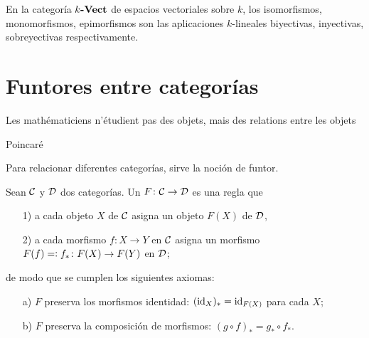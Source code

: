 \documentclass{article}
\numberwithin{equation}{section}
\theoremstyle{definition}
\begin{document}
\begin{ejemplo}
  En la categoría $k\text{\bf -Vect}$ de espacios vectoriales sobre $k$, los
  isomorfismos, monomorfismos, epimorfismos son las aplicaciones $k$-lineales
  biyectivas, inyectivas, sobreyectivas respectivamente.
\end{ejemplo}


\section{Funtores entre categorías}

\epigraph{Les mathématiciens n'étudient pas des objets, mais des relations entre
  les objets}{Poincaré}


Para relacionar diferentes categorías, sirve la noción de funtor.

\begin{definicion}
  Sean $\mathcal{C}$ y $\mathcal{D}$ dos categorías. Un 
  $F\colon \mathcal{C} \to \mathcal{D}$ es una regla que

  \begin{enumerate}
  \item[1)] a cada objeto $X$ de $\mathcal{C}$ asigna un objeto $F (X)$ de
    $\mathcal{D}$,

  \item[2)] a cada morfismo $f\colon X\to Y$ en $\mathcal{C}$ asigna un morfismo
    $F (f) =\mathrel{\mathop:} f_*\colon F (X) \to F (Y)$ en $\mathcal{D}$;
  \end{enumerate}
  de modo que se cumplen los siguientes axiomas:
  \begin{enumerate}
  \item[a)] $F$ preserva los morfismos identidad: $(\mathrm{id}_{X})_* = \mathrm{id}_{F (X)}$
    para cada $X$;
  \item[b)] $F$ preserva la composición de morfismos: $(g\circ f)_* = g_*\circ f_*$.
  \end{enumerate}
\end{definicion}
\end{document}
